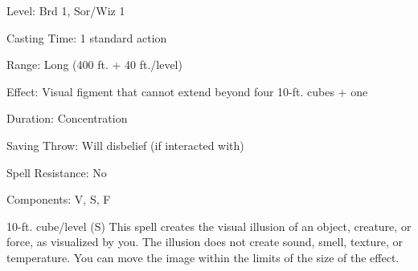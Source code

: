 
\begin{description*}
\item[Level:] Brd 1, Sor/Wiz 1
\item[Casting Time:] 1 standard action
\item[Range:] Long (400 ft. + 40 ft./level)
\item[Effect:] Visual figment that cannot extend beyond four 10-ft. cubes + one
\item[Duration:] Concentration
\item[Saving Throw:] Will disbelief (if interacted with)
\item[Spell Resistance:] No
\item[Components:] V, S, F
\end{description*}

10-ft. cube/level (S)
This spell creates the visual illusion of an object, creature, or force, as visualized
by you. The illusion does not create sound, smell, texture, or temperature. You
can move the image within the limits of the size of the effect.